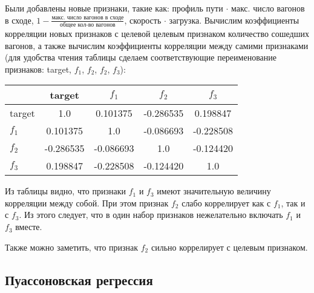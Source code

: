 Были добавлены новые признаки, такие как: профиль пути $\cdot$ макс. число вагонов в сходе, $1 - \frac{\text{макс. число вагонов в сходе}}{\text{общее кол-во вагонов}}$, скорость $\cdot$ загрузка. Вычислим коэффициенты корреляции новых признаков с целевой целевым признаком количество сошедших вагонов, а также вычислим коэффициенты корреляции между самими признаками (для удобства чтения таблицы сделаем соответствующие переименование признаков: target, $f_1$, $f_2$, $f_2$, $f_3$):


\begin{table}[H]
    \label{tab:corr_new_features}
    \begin{tabular}{|l|c|c|c|c|}
        \hline
        & target & $f_1$ & $f_2$ & $f_3$ \\ \hline
        target & 1.0       & 0.101375  & -0.286535 & 0.198847  \\ \hline
        $f_1$  & 0.101375  & 1.0       & -0.086693 & -0.228508 \\ \hline
        $f_2$  & -0.286535 & -0.086693 & 1.0       & -0.124420 \\ \hline
        $f_3$  & 0.198847  & -0.228508 & -0.124420 & 1.0       \\ \hline
    \end{tabular}
\end{table}


Из таблицы видно, что признаки $f_1$ и $f_3$ имеют значительную величину корреляции между собой. При этом признак $f_2$ слабо коррелирует как с $f_1$, так и с $f_3$. Из этого следует, что в один набор признаков нежелательно включать $f_1$ и $f_3$ вместе.

Также можно заметить, что признак $f_2$ сильно коррелирует с целевым признаком.





\subsection{Пуассоновская регрессия}

